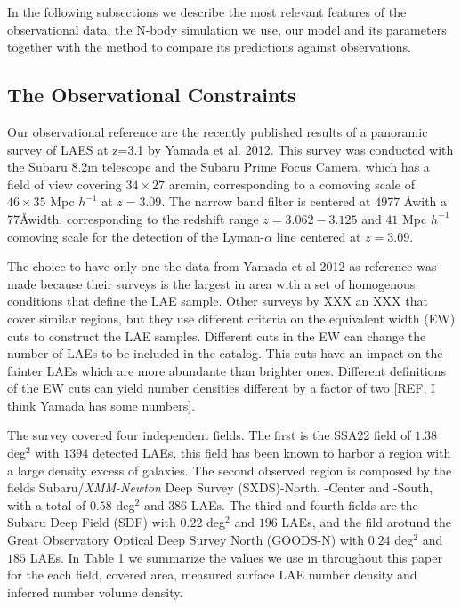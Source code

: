 \documentclass{emulateapj}
\begin{document}
In the following subsections we describe the most relevant features of the observational data, the N-body simulation we use, our model and its parameters together with the method to compare its predictions against observations.

\subsection{The Observational Constraints}

Our observational reference are the recently published results of a panoramic survey of LAES at z=3.1 by Yamada et al. 2012. This survey was conducted with the Subaru 8.2m telescope and the Subaru Prime Focus Camera, which has a field of view covering $34\times 27$ arcmin, corresponding to a comoving scale of $46\times35$ Mpc $h^{-1}$ at $z=3.09$. The narrow band filter is centered at $4977$ \AA with a $77$\AA width, corresponding to the redshift range $z=3.062-3.125$ and $41$ Mpc $h^{-1}$ comoving scale for the detection of the Lyman-$\alpha$ line centered at $z=3.09$.

The choice to have only one the data from Yamada et al 2012 as reference was  made because their surveys is the largest in area with a set of homogenous conditions that define the LAE sample. Other surveys by XXX an XXX that cover similar regions, but they use different criteria on the equivalent width (EW) cuts to construct the LAE samples. Different cuts in the EW can change the number of LAEs to be included in the catalog. This cuts have an impact on the fainter LAEs which are more abundante than brighter ones. Different definitions of the EW cuts can yield number densities different by a factor of two [REF, I think Yamada has some numbers].


The survey covered four independent fields. The first is the SSA22 field of $1.38$ deg$^2$ with $1394$ detected LAEs, this field has been known to harbor a region with a large density excess of galaxies. The second observed region is composed by the fields Subaru/{\it XMM-Newton} Deep Survey (SXDS)-North, -Center and -South, with a total of $0.58$ deg$^2$ and $386$ LAEs. The third and fourth fields are the Subaru Deep Field (SDF) with $0.22$ deg$^2$ and $196$ LAEs, and the fild arotund the Great Observatory Optical Deep Survey North (GOODS-N) with $0.24$ deg$^2$ and $185$ LAEs. In Table 1 we summarize the values we use in throughout this paper for the each field, covered area, measured surface LAE number density and inferred number volume density.
\end{document}
